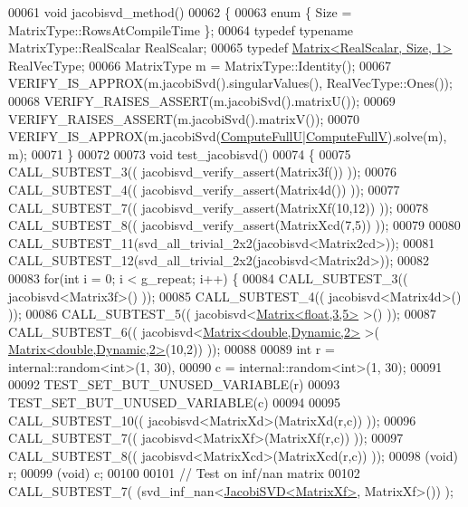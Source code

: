\begin{DoxyCode}
00061 \textcolor{keywordtype}{void} jacobisvd\_method()
00062 \{
00063   \textcolor{keyword}{enum} \{ Size = MatrixType::RowsAtCompileTime \};
00064   \textcolor{keyword}{typedef} \textcolor{keyword}{typename} MatrixType::RealScalar RealScalar;
00065   \textcolor{keyword}{typedef} \hyperlink{group___core___module_class_eigen_1_1_matrix}{Matrix<RealScalar, Size, 1>} RealVecType;
00066   MatrixType m = MatrixType::Identity();
00067   VERIFY\_IS\_APPROX(m.jacobiSvd().singularValues(), RealVecType::Ones());
00068   VERIFY\_RAISES\_ASSERT(m.jacobiSvd().matrixU());
00069   VERIFY\_RAISES\_ASSERT(m.jacobiSvd().matrixV());
00070   VERIFY\_IS\_APPROX(m.jacobiSvd(\hyperlink{group__enums_ggae3e239fb70022eb8747994cf5d68b4a9a2b4f91ca5859a4159dbfe8090043817f}{ComputeFullU}|\hyperlink{group__enums_ggae3e239fb70022eb8747994cf5d68b4a9a52c6f7e80bbf9a42297c88f700245b51}{ComputeFullV}).solve(m), m);
00071 \}
00072 
00073 \textcolor{keywordtype}{void} test\_jacobisvd()
00074 \{
00075   CALL\_SUBTEST\_3(( jacobisvd\_verify\_assert(Matrix3f()) ));
00076   CALL\_SUBTEST\_4(( jacobisvd\_verify\_assert(Matrix4d()) ));
00077   CALL\_SUBTEST\_7(( jacobisvd\_verify\_assert(MatrixXf(10,12)) ));
00078   CALL\_SUBTEST\_8(( jacobisvd\_verify\_assert(MatrixXcd(7,5)) ));
00079   
00080   CALL\_SUBTEST\_11(svd\_all\_trivial\_2x2(jacobisvd<Matrix2cd>));
00081   CALL\_SUBTEST\_12(svd\_all\_trivial\_2x2(jacobisvd<Matrix2d>));
00082 
00083   \textcolor{keywordflow}{for}(\textcolor{keywordtype}{int} i = 0; i < g\_repeat; i++) \{
00084     CALL\_SUBTEST\_3(( jacobisvd<Matrix3f>() ));
00085     CALL\_SUBTEST\_4(( jacobisvd<Matrix4d>() ));
00086     CALL\_SUBTEST\_5(( jacobisvd<\hyperlink{group___core___module_class_eigen_1_1_matrix}{Matrix<float,3,5>} >() ));
00087     CALL\_SUBTEST\_6(( jacobisvd<\hyperlink{group___core___module_class_eigen_1_1_matrix}{Matrix<double,Dynamic,2>} >(
      \hyperlink{group___core___module_class_eigen_1_1_matrix}{Matrix<double,Dynamic,2>}(10,2)) ));
00088 
00089     \textcolor{keywordtype}{int} r = internal::random<int>(1, 30),
00090         c = internal::random<int>(1, 30);
00091     
00092     TEST\_SET\_BUT\_UNUSED\_VARIABLE(r)
00093     TEST\_SET\_BUT\_UNUSED\_VARIABLE(c)
00094     
00095     CALL\_SUBTEST\_10(( jacobisvd<MatrixXd>(MatrixXd(r,c)) ));
00096     CALL\_SUBTEST\_7(( jacobisvd<MatrixXf>(MatrixXf(r,c)) ));
00097     CALL\_SUBTEST\_8(( jacobisvd<MatrixXcd>(MatrixXcd(r,c)) ));
00098     (void) r;
00099     (void) c;
00100 
00101     \textcolor{comment}{// Test on inf/nan matrix}
00102     CALL\_SUBTEST\_7(  (svd\_inf\_nan<\hyperlink{group___s_v_d___module_class_eigen_1_1_jacobi_s_v_d}{JacobiSVD<MatrixXf>}, MatrixXf>()) );

\end{DoxyCode}

